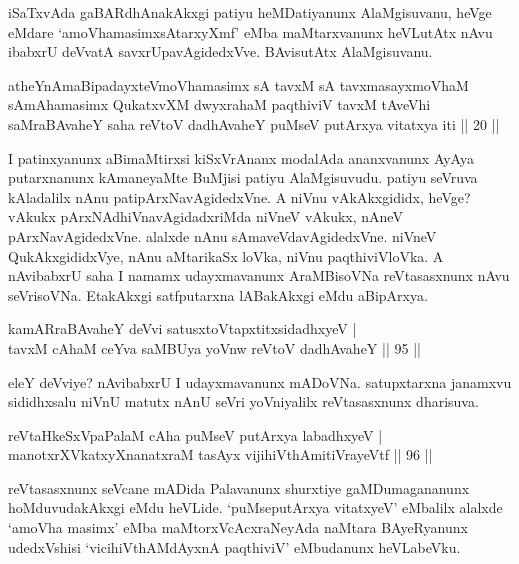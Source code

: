 \begin{artha}
iSaTxvAda gaBARdhAnakAkxgi patiyu heMDatiyanunx AlaMgisuvanu, heVge 
eMdare `amoVhamasimxsAtarxyXmf' eMba maMtarxvanunx heVLutAtx nAvu 
ibabxrU deVvatA savxrUpavAgidedxVve. BAvisutAtx AlaMgisuvanu.
\end{artha}

\begin{kandikeshl}
atheYnAmaBipadayxteV\s moV\s hamasimx sA tavxM sA tavxmasayxmoV\s haM sAmAhamasimx QukatxvXM dwyxrahaM paqthiviV tavxM tAveVhi saMraBAvaheY saha reVtoV dadhAvaheY puMseV putArxya vitatxya iti || 20 ||
\end{kandikeshl}


\begin{artha}
I patinxyanunx aBimaMtirxsi kiSxVrAnanx modalAda ananxvanunx AyAya 
putarxnanunx kAmaneyaMte BuMjisi patiyu AlaMgisuvudu. patiyu seVruva 
kAladalilx nAnu patipArxNavAgidedxVne. A niVnu vAkAkxgididx, heVge? 
vAkukx pArxNAdhiVnavAgidadxriMda niVneV vAkukx, nAneV 
pArxNavAgidedxVne. alalxde nAnu sAmaveVdavAgidedxVne. niVneV 
QukAkxgididxVye, nAnu aMtarikaSx loVka, niVnu paqthiviVloVka. A 
nAvibabxrU saha I namamx udayxmavanunx AraMBisoVNa reVtasasxnunx nAvu 
seVrisoVNa. EtakAkxgi satfputarxna lABakAkxgi eMdu aBipArxya.
\end{artha}

\begin{shl}
kamAR\s \s raBAvaheY deVvi satusxtoVtapxtitxsidadhxyeV | \\
tavxM cAhaM ceYva saMBUya yoVnw reVtoV dadhAvaheY \hfill|| 95 || 
\end{shl}
	
\begin{artha}
eleY deVviye? nAvibabxrU I udayxmavanunx mADoVNa. satupxtarxna 
janamxvu sididhxsalu niVnU matutx nAnU seVri yoVniyalilx reVtasasxnunx 
dharisuva.
\end{artha}

\begin{shl}
reVtaHkeSxVpaPalaM cA\s \s ha puMseV putArxya labadhxyeV | \\
manotxrXVkatxyXnanatxraM tasAyx vijihiVthAmitiVrayeVtf \hfill|| 96 || 
\end{shl}

\begin{artha}
reVtasasxnunx seVcane mADida Palavanunx shurxtiye gaMDumagananunx 
hoMduvudakAkxgi eMdu heVLide. `puMseputArxya vitatxyeV' eMbalilx 
alalxde `amoV\s ha masimx' eMba maMtorxVcAcxraNeyAda naMtara 
BAyeRyanunx udedxVshisi `vicihiVthAMdAyxnA paqthiviV' eMbudanunx 
heVLabeVku.
\end{artha}

